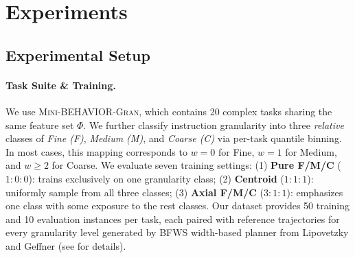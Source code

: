 \documentclass{article}
\begin{document}



\section{Experiments}
\label{sec:experiments}
\subsection{Experimental Setup}
\paragraph{Task Suite \& Training.} We use \textsc{Mini-BEHAVIOR-Gran}, which contains 20 complex tasks sharing the same feature set $\Phi$. We further classify instruction granularity into three \emph{relative} classes of \emph{Fine (F)}, \emph{Medium (M)}, and \emph{Coarse (C)} via per-task quantile binning. In most cases, this mapping corresponds to $w=0$ for Fine, $w=1$ for Medium, and $w \ge 2$ for Coarse. We evaluate seven training settings: (1) \textbf{Pure F/M/C} ($1\!:\!0\!:\!0$): trains exclusively on one granularity class; (2) \textbf{Centroid} ($1\!:\!1\!:\!1$): uniformly sample from all three classes; (3) \textbf{Axial F/M/C} ($3\!:\!1\!:\!1$): emphasizes one class with some exposure to the rest classes. Our dataset provides 50 training and 10 evaluation instances per task, each paired with reference trajectories for every granularity level generated by \textsc{BFWS} width-based planner from Lipovetzky and Geffner  (see  for details).
\end{document}

